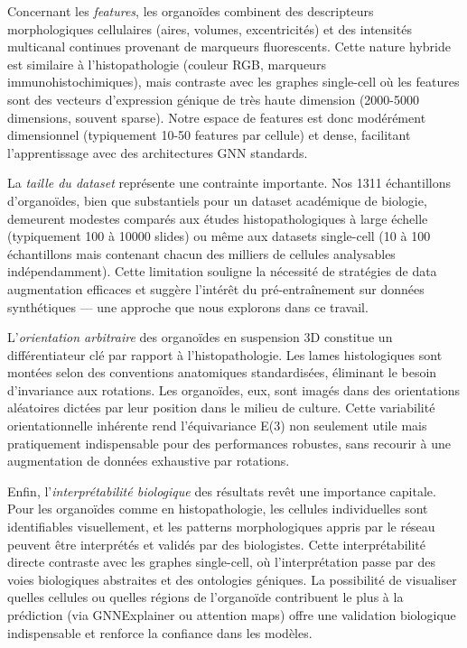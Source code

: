 Concernant les \textit{features}, les organoïdes combinent des descripteurs morphologiques cellulaires (aires, volumes, excentricités) et des intensités multicanal continues provenant de marqueurs fluorescents. Cette nature hybride est similaire à l'histopathologie (couleur RGB, marqueurs immunohistochimiques), mais contraste avec les graphes single-cell où les features sont des vecteurs d'expression génique de très haute dimension (2000-5000 dimensions, souvent sparse). Notre espace de features est donc modérément dimensionnel (typiquement 10-50 features par cellule) et dense, facilitant l'apprentissage avec des architectures GNN standards.

La \textit{taille du dataset} représente une contrainte importante. Nos 1311 échantillons d'organoïdes, bien que substantiels pour un dataset académique de biologie, demeurent modestes comparés aux études histopathologiques à large échelle (typiquement 100 à 10000 slides) ou même aux datasets single-cell (10 à 100 échantillons mais contenant chacun des milliers de cellules analysables indépendamment). Cette limitation souligne la nécessité de stratégies de data augmentation efficaces et suggère l'intérêt du pré-entraînement sur données synthétiques — une approche que nous explorons dans ce travail.

L'\textit{orientation arbitraire} des organoïdes en suspension 3D constitue un différentiateur clé par rapport à l'histopathologie. Les lames histologiques sont montées selon des conventions anatomiques standardisées, éliminant le besoin d'invariance aux rotations. Les organoïdes, eux, sont imagés dans des orientations aléatoires dictées par leur position dans le milieu de culture. Cette variabilité orientationnelle inhérente rend l'équivariance E(3) non seulement utile mais pratiquement indispensable pour des performances robustes, sans recourir à une augmentation de données exhaustive par rotations.

Enfin, l'\textit{interprétabilité biologique} des résultats revêt une importance capitale. Pour les organoïdes comme en histopathologie, les cellules individuelles sont identifiables visuellement, et les patterns morphologiques appris par le réseau peuvent être interprétés et validés par des biologistes. Cette interprétabilité directe contraste avec les graphes single-cell, où l'interprétation passe par des voies biologiques abstraites et des ontologies géniques. La possibilité de visualiser quelles cellules ou quelles régions de l'organoïde contribuent le plus à la prédiction (via GNNExplainer ou attention maps) offre une validation biologique indispensable et renforce la confiance dans les modèles.

